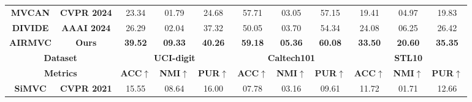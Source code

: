 \documentclass{article}
\theoremstyle{plain}
\theoremstyle{definition}
\theoremstyle{remark}
\begin{document}
\begin{itemize}
\begin{table}[]
{\begin{tabular}{cc|ccc|ccc|ccc}
\multicolumn{1}{c|}{\textbf{MVCAN}}   & \textbf{CVPR 2024}    & 23.34                                 & 01.79                                 & 24.68                                 & {\color[HTML]{3531FF} 57.71}          & 03.05                                 & {\color[HTML]{3531FF} 57.15}          & 19.41                                 & 04.97                                 & 19.83                                 \\
\multicolumn{1}{c|}{\textbf{DIVIDE}}  & \textbf{AAAI 2024}    & 26.29                                 & 02.04                                 & {\color[HTML]{3531FF} 37.32}          & 50.05                                 & 03.70                                 & 54.34                                 & {\color[HTML]{3531FF} 24.08}          & {\color[HTML]{3531FF} 06.25}          & {\color[HTML]{3531FF} 26.42}          \\ \hline
\multicolumn{1}{c|}{\textbf{AIRMVC}} & \textbf{Ours}         & {\color[HTML]{FE0000} \textbf{39.52}} & {\color[HTML]{FE0000} \textbf{09.33}} & {\color[HTML]{FE0000} \textbf{40.26}} & {\color[HTML]{FE0000} \textbf{59.18}} & {\color[HTML]{FE0000} \textbf{05.36}} & {\color[HTML]{FE0000} \textbf{60.08}} & {\color[HTML]{FE0000} \textbf{33.50}} & {\color[HTML]{FE0000} \textbf{20.60}} & {\color[HTML]{FE0000} \textbf{35.35}} \\ \hline
\multicolumn{2}{c|}{\textbf{Dataset}}                         & \multicolumn{3}{c|}{\textbf{UCI-digit}}                                                                               & \multicolumn{3}{c|}{\textbf{Caltech101}}                                                                              & \multicolumn{3}{c}{\textbf{STL10}}                                                                                    \\ \hline
\multicolumn{2}{c|}{\textbf{Metrics}}                         & \textbf{ACC$\uparrow$}                          & \textbf{NMI$\uparrow$}                          & \textbf{PUR$\uparrow$}                          & \textbf{ACC$\uparrow$}                          & \textbf{NMI$\uparrow$}                          & \textbf{PUR$\uparrow$}                          & \textbf{ACC$\uparrow$}                          & \textbf{NMI$\uparrow$}                          & \textbf{PUR$\uparrow$}                          \\ \hline
\multicolumn{1}{c|}{\textbf{SiMVC}}   & \textbf{CVPR 2021}    & 15.55                                 & 08.64                                 & 16.00                                 & 07.78                                 & 03.16                                 & 09.61                                 & 11.72                                 & 01.71                                 & 12.66                                 \\

\end{tabular}}
\end{table}
\end{itemize}
\end{document}
